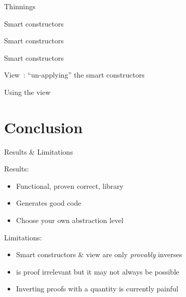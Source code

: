 \documentclass{beamer}
\begin{document}
\begin{frame}{Thinnings}

\vfill
{}

\end{frame}

\begin{frame}{Smart constructors}


\end{frame}

\begin{frame}{Smart constructors}

\end{frame}

\begin{frame}{Smart constructors}

\end{frame}

\begin{frame}{View~\cite{DBLP:conf/popl/Wadler87}: ``un-applying'' the smart constructors}

\end{frame}

\begin{frame}{Using the view}
\end{frame}


\section{Conclusion}

\begin{frame}{Results \& Limitations}

Results:

\begin{itemize}
  \item Functional, proven correct, library
  \item Generates good code
  \item Choose your own abstraction level
\end{itemize}

\vfill

Limitations:

\begin{itemize}
  \item Smart constructors \& view are only \emph{provably} inverses
  \item {} is proof irrelevant but it may not always be possible
  \item Inverting proofs with a  quantity is currently painful
\end{itemize}
\end{frame}
\end{document}
